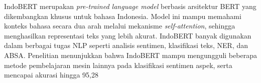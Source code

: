 IndoBERT merupakan \textit{pre-trained language model} berbasis arsitektur BERT yang dikembangkan khusus untuk bahasa Indonesia. Model ini mampu memahami konteks bahasa secara dua arah melalui mekanisme \textit{self-attention}, sehingga menghasilkan representasi teks yang lebih akurat. IndoBERT banyak digunakan dalam berbagai tugas NLP seperti analisis sentimen, klasifikasi teks, NER, dan ABSA. Penelitian menunjukkan bahwa IndoBERT mampu mengungguli beberapa metode pembelajaran mesin lainnya pada klasifikasi sentimen aspek, serta mencapai akurasi hingga 95,28%
